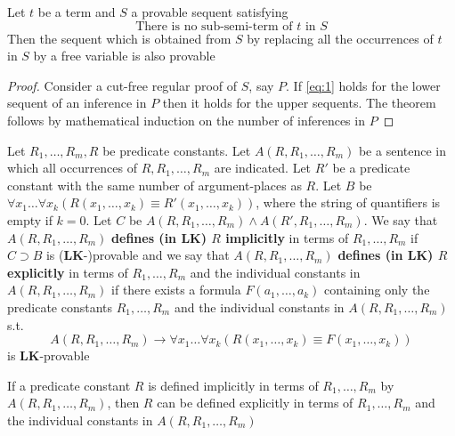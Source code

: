 \documentclass[11pt]{article}
\def \LK {\textbf{LK}}
\begin{document}
\begin{theorem}[]
Let \(t\) be a term and \(S\) a provable sequent satisfying
\begin{equation}
\label{eq:1}
\text{There is no sub-semi-term of }t\text{ in }S
\end{equation}
Then the sequent which is obtained from \(S\) by replacing all the occurrences of \(t\) in \(S\)
by a free variable is also provable
\end{theorem}

\begin{proof}
Consider a cut-free regular proof of \(S\), say \(P\).  If \ref{eq:1} holds for the lower sequent
of an inference in \(P\) then it holds for the upper sequents. The theorem follows by
mathematical induction on the number of inferences in \(P\)
\end{proof}

\begin{definition}[]
Let \(R_1,\dots,R_m,R\) be predicate constants. Let \(A(R,R_1,\dots,R_m)\) be a sentence in which
all occurrences of \(R,R_1,\dots,R_m\) are indicated. Let \(R'\) be a predicate constant with the
same number of argument-places as \(R\). Let \(B\)
be \(\forall x_1\dots\forall x_k(R(x_1,\dots,x_k)\equiv R'(x_1,\dots,x_k))\), where the string of
quantifiers is empty if \(k=0\). Let \(C\) be \(A(R,R_1,\dots,R_m)\wedge A(R',R_1,\dots,R_m)\). We say
that \(A(R,R_1,\dots,R_m)\) \textbf{defines (in \(\LK\)) \(R\) implicitly} in terms of \(R_1,\dots,R_m\)
if \(C\supset B\) is (\(\LK\)-)provable and we say that \(A(R,R_1,\dots,R_m)\) \textbf{defines
(in \(\LK\)) \(R\) explicitly} in terms of \(R_1,\dots,R_m\) and the individual constants
in \(A(R,R_1,\dots,R_m)\) if there exists a formula \(F(a_1,\dots,a_k)\) containing only the
predicate constants \(R_1,\dots,R_m\) and the individual constants in \(A(R,R_1,\dots,R_m)\) s.t.
\begin{equation*}
A(R,R_1,\dots,R_m)\to\forall x_1\dots\forall x_k
(R(x_1,\dots,x_k)\equiv F(x_1,\dots,x_k))
\end{equation*}
is \(\LK\)-provable
\end{definition}

\begin{proposition}[Beth's definability theorem for $\LK$]
If a predicate constant \(R\) is defined implicitly in terms of \(R_1,\dots,R_m\)
by \(A(R,R_1,\dots,R_m)\), then \(R\) can be defined explicitly in terms of \(R_1,\dots,R_m\) and
the individual constants in \(A(R,R_1,\dots,R_m)\)
\end{proposition}
\end{document}
